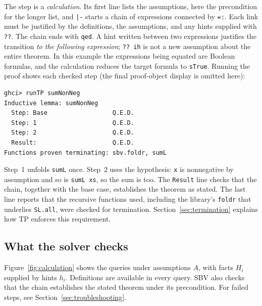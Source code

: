 \documentclass[acmsmall,screen,review,anonymous,nonacm]{acmart}
\newcommand{\code}[1]{\texttt{#1}}
\begin{document}
The step is a \emph{calculation}. Its first line lists the assumptions, here the
precondition for the longer list, and \code{|-} starts a chain of expressions
connected by \code{=:}. Each link must be justified by the definitions, the
assumptions, and any hints supplied with \code{??}. The chain ends with
\code{qed}. A hint written between two expressions justifies the transition
\emph{to the following expression}; \code{?? ih} is not a new assumption about
the entire theorem. In this example the expressions being equated are Boolean
formulas, and the calculation reduces the target formula to \code{sTrue}.
Running the proof shows each checked step (the final proof-object display is
omitted here):
\begin{lstlisting}[style=output]
ghci> runTP sumNonNeg
Inductive lemma: sumNonNeg
  Step: Base                  Q.E.D.
  Step: 1                     Q.E.D.
  Step: 2                     Q.E.D.
  Result:                     Q.E.D.
Functions proven terminating: sbv.foldr, sumL
\end{lstlisting}
Step~1 unfolds \code{sumL} once. Step~2 uses the hypothesis: \code{x} is
nonnegative by assumption and so is \code{sumL xs}, so the sum is too. The
\code{Result} line checks that the chain, together with the base case, establishes
the theorem as stated. The last line reports that the recursive functions used,
including the library's \code{foldr} that underlies \code{SL.all}, were checked for
termination. Section~\ref{sec:termination} explains how TP enforces this requirement.

\subsection{What the solver checks}

Figure~\ref{fig:calculation} shows the queries under assumptions $A$, with
facts $H_i$ supplied by hints $h_i$. Definitions are available in every query.
SBV also checks that the chain establishes the stated theorem under its
precondition. For failed steps, see Section~\ref{sec:troubleshooting}.
\end{document}
